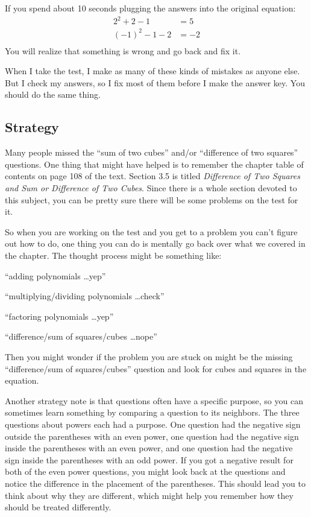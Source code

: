 \documentclass[fleqn,addpoints]{exam}
\begin{document}
If you spend about 10 seconds plugging the answers into the original equation: 
\begin{align*}  
  2^2 + 2 - 1 &= 5 \\ 
  (-1)^2 - 1 - 2 &= -2 \\
\end{align*}
You will realize that something is wrong and go back and fix it.

When I take the test, I make as many of these kinds of mistakes as anyone else.  But I check my answers, so I fix
most of them before I make the answer key.  You should do the same thing.


\subsection{Strategy}

Many people missed the ``sum of two cubes'' and/or ``difference of two squares'' questions.  One thing that might have
helped is to remember the chapter table of contents on page 108 of the text.  Section 3.5 is titled {\em Difference of
  Two Squares and Sum or Difference of Two Cubes}.  Since there is a whole section devoted to this subject, you can be
pretty sure there will be some problems on the test for it.

So when you are working on the test and you get to a problem you can't figure out how to do, one thing you can do is
mentally go back over what we covered in the chapter.  The thought process might be something like:
\begin{itemize*}
  \item ``adding polynomials \ldots yep''
  \item ``multiplying/dividing polynomials \ldots check''
  \item ``factoring polynomials \ldots yep''
  \item ``difference/sum of squares/cubes \ldots nope''
\end{itemize*}

Then you might wonder if the problem you are stuck on might be the missing ``difference/sum of squares/cubes'' question
and look for cubes and squares in the equation.

Another strategy note is that questions often have a specific purpose, so you can sometimes learn something by comparing
a question to its neighbors.  The three questions about powers each had a purpose.  One question had the negative sign
outside the parentheses with an even power, one question had the negative sign inside the parentheses with an even
power, and one question had the negative sign inside the parentheses with an odd power.  If you got a negative result
for both of the even power questions, you might look back at the questions and notice the difference in the placement of
the parentheses.  This should lead you to think about why they are different, which might help you remember how they
should be treated differently.
\end{document}
